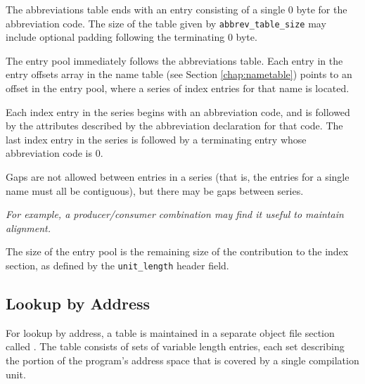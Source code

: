 The abbreviations table ends with an entry consisting of a single 0
byte for the abbreviation code. The size of the table given by
\texttt{abbrev\_table\_size} may include optional padding following the
terminating 0 byte.

The entry pool immediately follows the abbreviations table. 
Each entry in the entry offsets array in the name table (see 
Section \ref{chap:nametable})
points to an offset in the entry pool, where a series
of index entries for that name is located.

Each index entry in the series begins with an abbreviation code, and is
followed by the attributes described by the abbreviation declaration
for that code. The last index entry in the series is followed by a
terminating entry whose abbreviation code is 0.

Gaps are not allowed between entries in a series (that is, the entries
for a single name must all be contiguous), but there may be gaps
between series.

\textit{For example, a producer/consumer combination may find
it useful to maintain alignment.}

The size of the entry pool is the remaining size of the contribution to
the index section, as defined by the \texttt{unit\_length} header field.

\subsection{Lookup by Address}
\label{chap:lookupbyaddress}
For 
lookup by address, a table is maintained in a separate
object file section called 
\dotdebugaranges{}. The table consists
of sets of variable length entries, each set describing the
portion of the program\textquoteright{}s address space that is covered by
a single compilation unit.

